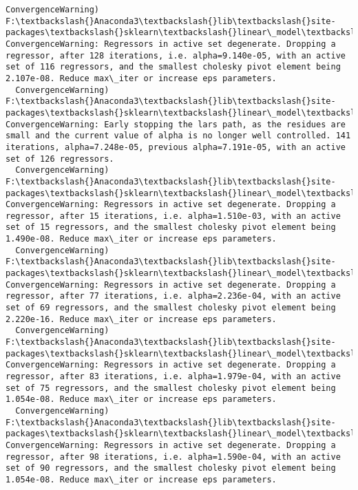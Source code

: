 \documentclass[11pt]{article}
\begin{document}
\begin{Verbatim}[commandchars=\\\{\}]
  ConvergenceWarning)
F:\textbackslash{}Anaconda3\textbackslash{}lib\textbackslash{}site-packages\textbackslash{}sklearn\textbackslash{}linear\_model\textbackslash{}least\_angle.py:313: ConvergenceWarning: Regressors in active set degenerate. Dropping a regressor, after 128 iterations, i.e. alpha=9.140e-05, with an active set of 116 regressors, and the smallest cholesky pivot element being 2.107e-08. Reduce max\_iter or increase eps parameters.
  ConvergenceWarning)
F:\textbackslash{}Anaconda3\textbackslash{}lib\textbackslash{}site-packages\textbackslash{}sklearn\textbackslash{}linear\_model\textbackslash{}least\_angle.py:339: ConvergenceWarning: Early stopping the lars path, as the residues are small and the current value of alpha is no longer well controlled. 141 iterations, alpha=7.248e-05, previous alpha=7.191e-05, with an active set of 126 regressors.
  ConvergenceWarning)
F:\textbackslash{}Anaconda3\textbackslash{}lib\textbackslash{}site-packages\textbackslash{}sklearn\textbackslash{}linear\_model\textbackslash{}least\_angle.py:313: ConvergenceWarning: Regressors in active set degenerate. Dropping a regressor, after 15 iterations, i.e. alpha=1.510e-03, with an active set of 15 regressors, and the smallest cholesky pivot element being 1.490e-08. Reduce max\_iter or increase eps parameters.
  ConvergenceWarning)
F:\textbackslash{}Anaconda3\textbackslash{}lib\textbackslash{}site-packages\textbackslash{}sklearn\textbackslash{}linear\_model\textbackslash{}least\_angle.py:313: ConvergenceWarning: Regressors in active set degenerate. Dropping a regressor, after 77 iterations, i.e. alpha=2.236e-04, with an active set of 69 regressors, and the smallest cholesky pivot element being 2.220e-16. Reduce max\_iter or increase eps parameters.
  ConvergenceWarning)
F:\textbackslash{}Anaconda3\textbackslash{}lib\textbackslash{}site-packages\textbackslash{}sklearn\textbackslash{}linear\_model\textbackslash{}least\_angle.py:313: ConvergenceWarning: Regressors in active set degenerate. Dropping a regressor, after 83 iterations, i.e. alpha=1.979e-04, with an active set of 75 regressors, and the smallest cholesky pivot element being 1.054e-08. Reduce max\_iter or increase eps parameters.
  ConvergenceWarning)
F:\textbackslash{}Anaconda3\textbackslash{}lib\textbackslash{}site-packages\textbackslash{}sklearn\textbackslash{}linear\_model\textbackslash{}least\_angle.py:313: ConvergenceWarning: Regressors in active set degenerate. Dropping a regressor, after 98 iterations, i.e. alpha=1.590e-04, with an active set of 90 regressors, and the smallest cholesky pivot element being 1.054e-08. Reduce max\_iter or increase eps parameters.

\end{Verbatim}
\end{document}
